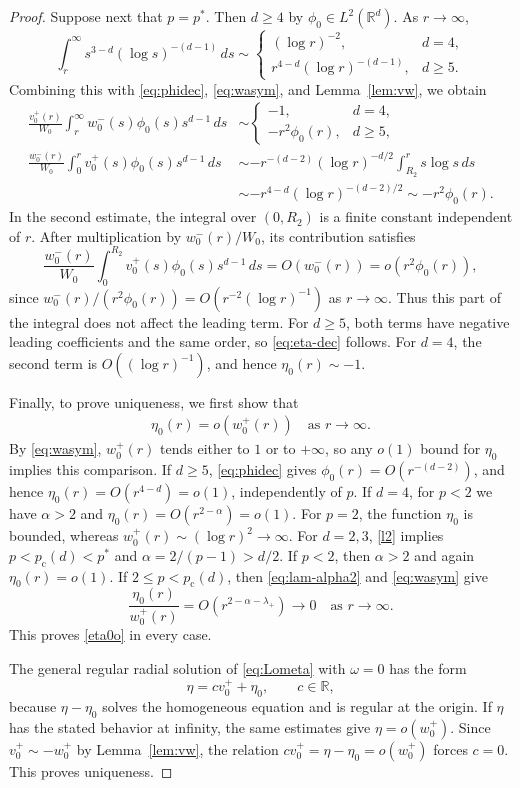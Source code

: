 \documentclass[12pt, a4paper, reqno]{amsart}
\numberwithin{equation}{section}
\theoremstyle{definition}
\theoremstyle{remark}
\newcommand{\R}{\mathbb R}
\begin{document}
\begin{proof}
Suppose next that $p=p^*$. Then $d\ge4$ by
$\phi_0\in L^2(\R^d)$. As $r\to\infty$,
\[
  \int_r^\infty s^{3-d}(\log s)^{-(d-1)}\,ds
  \sim
  \begin{cases}
    (\log r)^{-2}, & d=4,\\[2pt]
    r^{4-d}(\log r)^{-(d-1)}, & d\ge5.
  \end{cases}
\]
Combining this with \eqref{eq:phidec}, \eqref{eq:wasym}, and
Lemma~\ref{lem:vw}, we obtain
\begin{align*}
  \frac{v_0^+(r)}{W_0}
  \int_r^\infty w_0^-(s)\phi_0(s)s^{d-1}\,ds
  &\sim
  \begin{cases}
    -1, & d=4,\\[2pt]
    -r^2\phi_0(r), & d\ge5,
  \end{cases}
\\
  \frac{w_0^-(r)}{W_0}
  \int_0^r v_0^+(s)\phi_0(s)s^{d-1}\,ds
  &\sim-r^{-(d-2)}(\log r)^{-d/2}
       \int_{R_2}^r s\log s\,ds
\\&\sim-r^{4-d}(\log r)^{-(d-2)/2}
       \sim-r^2\phi_0(r).
\end{align*}
In the second estimate, the integral over $(0,R_2)$ is a finite
constant independent of $r$. After multiplication by $w_0^-(r)/W_0$,
its contribution satisfies
\[
  \frac{w_0^-(r)}{W_0}
  \int_0^{R_2}v_0^+(s)\phi_0(s)s^{d-1}\,ds
  =O(w_0^-(r))=o(r^2\phi_0(r)),
\]
since $w_0^-(r)/(r^2\phi_0(r))=O(r^{-2}(\log r)^{-1})$ as $r\to\infty$.
Thus this part of the integral does not affect the leading term.
For $d\ge5$, both terms have negative leading coefficients and the
same order, so \eqref{eq:eta-dec} follows. For $d=4$, the second term
is $O((\log r)^{-1})$, and hence $\eta_0(r)\sim-1$.

Finally, to prove uniqueness, we first show that
\begin{align}
\label{eta0o}
  \eta_0(r)=o(w_0^+(r))\quad\text{as }r\to\infty.
\end{align}
By \eqref{eq:wasym}, $w_0^+(r)$ tends either to $1$ or to $+\infty$,
so any $o(1)$ bound for $\eta_0$ implies this comparison.
If $d\ge5$, \eqref{eq:phidec} gives $\phi_0(r)=O(r^{-(d-2)})$,
and hence $\eta_0(r)=O(r^{4-d})=o(1)$, independently of $p$.
If $d=4$, for $p<2$ we have
$\alpha>2$ and $\eta_0(r)=O(r^{2-\alpha})=o(1)$.
For $p=2$, the function $\eta_0$ is bounded, whereas
$w_0^+(r)\sim(\log r)^2\to\infty$.
For $d=2,3$, \eqref{l2} implies $p<p_{\mathrm{c}}(d)<p^*$ and
$\alpha=2/(p-1)>d/2$. If $p<2$, then $\alpha>2$ and again
$\eta_0(r)=o(1)$. 
If $2\le p<p_{\mathrm c}(d)$, then
\eqref{eq:lam-alpha2} and \eqref{eq:wasym} give
\[
  \frac{\eta_0(r)}{w_0^+(r)}
  =O(r^{2-\alpha-\lambda_+})\to0\quad\text{as }r\to\infty.
\]
This proves \eqref{eta0o} in every case.

The general regular radial solution of \eqref{eq:Lometa} with
$\omega=0$ has the form
\[
  \eta=c v_0^++\eta_0,\qquad c\in\R,
\]
because $\eta-\eta_0$ solves the homogeneous equation and is regular
at the origin. If $\eta$ has the stated behavior at infinity, the
same estimates give $\eta=o(w_0^+)$. Since
$v_0^+\sim-w_0^+$ by Lemma~\ref{lem:vw}, the relation
$c v_0^+=\eta-\eta_0=o(w_0^+)$ forces $c=0$.
This proves uniqueness.
\end{proof}
\end{document}
